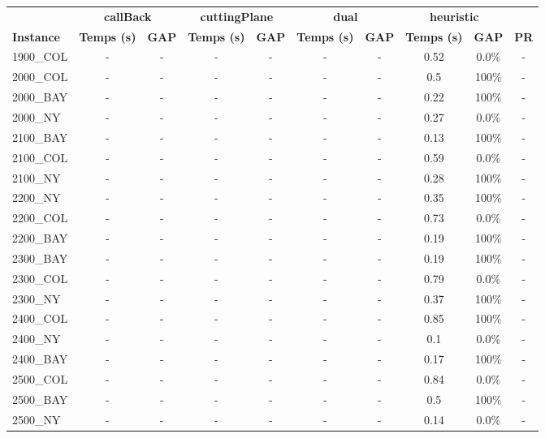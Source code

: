 \documentclass[main.tex]{subfiles}
\begin{document}
\begin{center}
\renewcommand{\arraystretch}{1.4} 
\begin{tabular}{lccccccccc}
	\hline
 & \multicolumn{2}{c}{\textbf{callBack}} & \multicolumn{2}{c}{\textbf{cuttingPlane}} & \multicolumn{2}{c}{\textbf{dual}} & \multicolumn{2}{c}{\textbf{heuristic}}\\
\textbf{Instance}  & \textbf{Temps (s)} & \textbf{GAP} & \textbf{Temps (s)} & \textbf{GAP} & \textbf{Temps (s)} & \textbf{GAP} & \textbf{Temps (s)} & \textbf{GAP} & \textbf{PR} \\\hline

1900\_COL & - & - 
 & - & - 
 & - & - 
 & 0.52 & 0.0\% & - \\
2000\_COL & - & - 
 & - & - 
 & - & - 
 & 0.5 &  100\%  & - \\
2000\_BAY & - & - 
 & - & - 
 & - & - 
 & 0.22 &  100\%  & - \\
2000\_NY & - & - 
 & - & - 
 & - & - 
 & 0.27 & 0.0\% & - \\
2100\_BAY & - & - 
 & - & - 
 & - & - 
 & 0.13 &  100\%  & - \\
2100\_COL & - & - 
 & - & - 
 & - & - 
 & 0.59 & 0.0\% & - \\
2100\_NY & - & - 
 & - & - 
 & - & - 
 & 0.28 &  100\%  & - \\
2200\_NY & - & - 
 & - & - 
 & - & - 
 & 0.35 &  100\%  & - \\
2200\_COL & - & - 
 & - & - 
 & - & - 
 & 0.73 & 0.0\% & - \\
2200\_BAY & - & - 
 & - & - 
 & - & - 
 & 0.19 &  100\%  & - \\
2300\_BAY & - & - 
 & - & - 
 & - & - 
 & 0.19 &  100\%  & - \\
2300\_COL & - & - 
 & - & - 
 & - & - 
 & 0.79 & 0.0\% & - \\
2300\_NY & - & - 
 & - & - 
 & - & - 
 & 0.37 &  100\%  & - \\
2400\_COL & - & - 
 & - & - 
 & - & - 
 & 0.85 &  100\%  & - \\
2400\_NY & - & - 
 & - & - 
 & - & - 
 & 0.1 & 0.0\% & - \\
2400\_BAY & - & - 
 & - & - 
 & - & - 
 & 0.17 &  100\%  & - \\
2500\_COL & - & - 
 & - & - 
 & - & - 
 & 0.84 & 0.0\% & - \\
2500\_BAY & - & - 
 & - & - 
 & - & - 
 & 0.5 &  100\%  & - \\
2500\_NY & - & - 
 & - & - 
 & - & - 
 & 0.14 & 0.0\% & - \\
\hline\end{tabular}
\end{center}
\end{document}
